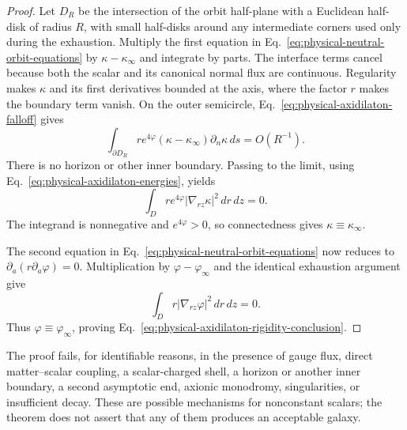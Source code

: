\begin{proof}
Let $D_R$ be the intersection of the orbit half-plane with a Euclidean
half-disk of radius $R$, with small half-disks around any intermediate
corners used only during the exhaustion. Multiply the first equation in
Eq.~\eqref{eq:physical-neutral-orbit-equations} by
$\kappa-\kappa_\infty$ and integrate by parts. The interface terms cancel
because both the scalar and its canonical normal flux are continuous.
Regularity makes $\kappa$ and its first derivatives bounded at the axis,
where the factor $r$ makes the boundary term vanish. On the outer
semicircle, Eq.~\eqref{eq:physical-axidilaton-falloff} gives
\begin{equation}
 \int_{\partial D_R}
 r e^{4\varphi}(\kappa-\kappa_\infty)
 \partial_n\kappa\,ds=O(R^{-1}).
 \label{eq:physical-axion-boundary-estimate}
\end{equation}
There is no horizon or other inner boundary. Passing to the limit, using
Eq.~\eqref{eq:physical-axidilaton-energies}, yields
\begin{equation}
 \int_D re^{4\varphi}|\nabla_{rz}\kappa|^2\,dr\,dz=0.
 \label{eq:physical-axion-energy-zero}
\end{equation}
The integrand is nonnegative and $e^{4\varphi}>0$, so connectedness gives
$\kappa\equiv\kappa_\infty$.

The second equation in
Eq.~\eqref{eq:physical-neutral-orbit-equations} now reduces to
$\partial_a(r\partial_a\varphi)=0$. Multiplication by
$\varphi-\varphi_\infty$ and the identical exhaustion argument give
\begin{equation}
 \int_D r|\nabla_{rz}\varphi|^2\,dr\,dz=0.
 \label{eq:physical-dilaton-energy-zero}
\end{equation}
Thus $\varphi\equiv\varphi_\infty$, proving
Eq.~\eqref{eq:physical-axidilaton-rigidity-conclusion}.
\end{proof}

\begin{remark}
\label{rem:physical-axidilaton-rigidity-scope}
The proof fails, for identifiable reasons, in the presence of gauge flux,
direct matter--scalar coupling, a scalar-charged shell, a horizon or another
inner boundary, a second asymptotic end, axionic monodromy, singularities, or
insufficient decay. These are possible mechanisms for nonconstant scalars;
the theorem does not assert that any of them produces an acceptable galaxy.
\end{remark}

